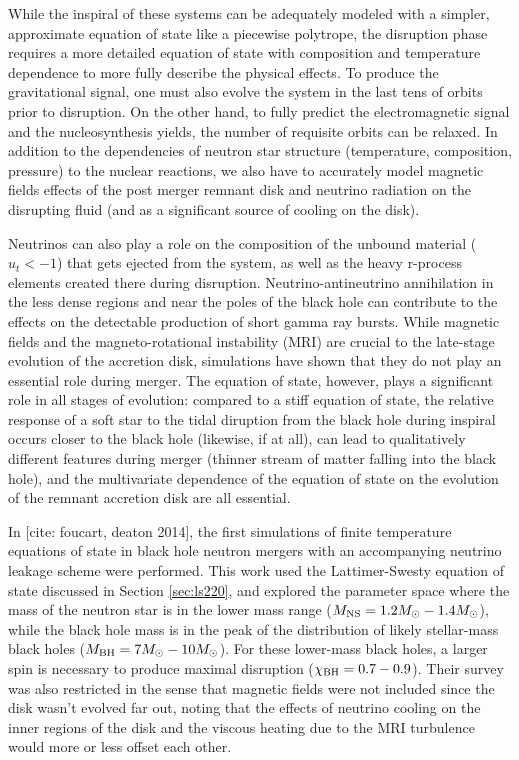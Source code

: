 While the inspiral of these systems can be adequately modeled with a simpler, approximate equation of state like a piecewise polytrope, the disruption phase requires a more detailed equation of state with composition and temperature dependence to more fully describe the physical effects.  To produce the gravitational signal, one must also evolve the system in the last tens of orbits prior to disruption.  On the other hand, to fully predict the electromagnetic signal and the nucleosynthesis yields, the number of requisite orbits can be relaxed.  In addition to the dependencies of neutron star structure (temperature, composition, pressure) to the nuclear reactions, we also have to accurately model magnetic fields effects of the post merger remnant disk and neutrino radiation on the disrupting fluid (and as a significant source of cooling on the disk).

Neutrinos can also play a role on the composition of the unbound material ($u_t < -1$) that gets ejected from the system, as well as the heavy r-process elements created there during disruption. Neutrino-antineutrino annihilation in the less dense regions and near the poles of the black hole can contribute to the effects on the detectable production of short gamma ray bursts.  While magnetic fields and the magneto-rotational instability (MRI) are crucial to the late-stage evolution of the accretion disk, simulations have shown that they do not play an essential role during merger.  The equation of state, however, plays a significant role in all stages of evolution: compared to a stiff equation of state, the relative response of a soft star to the tidal diruption from the black hole during inspiral occurs closer to the black hole (likewise, if at all), can lead to qualitatively different features during merger (thinner stream of matter falling into the black hole), and the multivariate dependence of the equation of state on the evolution of the remnant accretion disk are all essential.

In [cite: foucart, deaton 2014], the first simulations of finite temperature equations of state in black hole neutron mergers with an accompanying neutrino leakage scheme were performed.  This work used the Lattimer-Swesty equation of state discussed in Section \ref{sec:ls220}, and explored the parameter space where the mass of the neutron star is in the lower mass range ($M_{\rm NS} = 1.2 M_\odot - 1.4 M_\odot$), while the black hole mass is in the peak of the distribution of likely stellar-mass black holes ($M_{\rm BH} = 7 M_\odot - 10 M_\odot$).  For these lower-mass black holes, a larger spin is necessary to produce maximal disruption ($\chi_{\rm BH} = 0.7 - 0.9$).  Their survey was also restricted in the sense that magnetic fields were not included since the disk wasn't evolved far out, noting that the effects of neutrino cooling on the inner regions of the disk and the viscous heating due to the MRI turbulence would more or less offset each other.

